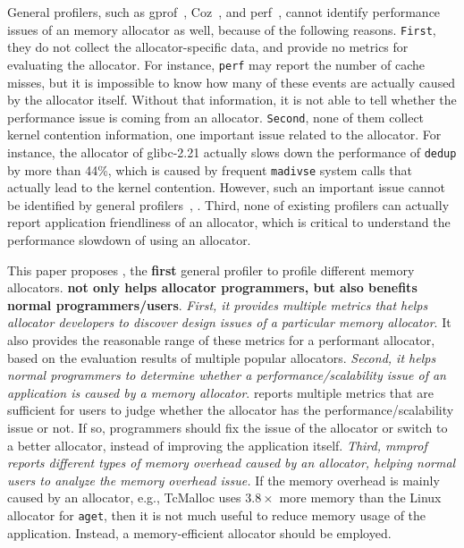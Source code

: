 General profilers, such as gprof~\citep{DBLP:conf/sigplan/GrahamKM82}, Coz~\citep{Coz}, and perf~\citep{perf}, cannot identify performance issues of an memory allocator as well, because of the following reasons. \texttt{First}, they do not collect the allocator-specific data, and  provide no metrics for evaluating the allocator. For instance, \texttt{perf} may report the number of cache misses, but it is impossible to know how many of these events are actually caused by the allocator itself. Without that information, it is not able to tell whether the performance issue is coming from an allocator. \texttt{Second}, none of them collect kernel contention information, one important issue related to the allocator. For instance, the allocator of glibc-2.21 actually slows down the performance of \texttt{dedup} by more than 44\%, which is caused by frequent \texttt{madivse} system calls that actually lead to the kernel contention. However, such an important issue cannot be identified by general profilers~\citep{DBLP:conf/sigplan/GrahamKM82, Coz, perf}, . Third, none of existing profilers can actually report application friendliness of an allocator, which is critical to understand the performance slowdown of using an allocator.   

This paper proposes \MP{}, the \textbf{first} general profiler to profile different memory allocators. \textbf{\MP{} not only helps allocator programmers, but also benefits normal programmers/users}. \textit{First, it provides multiple metrics that helps allocator developers to discover design issues of a particular memory allocator}. It also provides the reasonable range of these metrics for a performant allocator, based on the evaluation results of multiple popular allocators. \textit{Second, it helps normal programmers to determine whether a performance/scalability issue of an application is caused by a memory allocator}. \MP{} reports multiple metrics that are sufficient for users to judge whether the allocator has the performance/scalability issue or not. If so,  programmers should fix the issue of the allocator or switch to a better allocator, instead of improving the application itself. 
\textit{Third, mmprof reports different types of memory overhead caused by an allocator, helping normal users to analyze the memory overhead issue.} 
If the memory overhead is mainly caused by an allocator, e.g., TcMalloc uses $3.8\times$ more memory than the Linux allocator for \texttt{aget},
then it is not much useful to reduce memory usage of the application. Instead, a memory-efficient allocator should be employed.   


